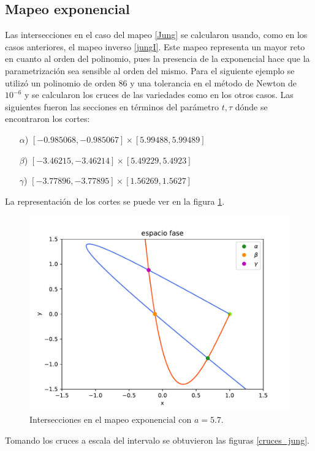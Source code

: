 \subsection{Mapeo exponencial}
Las intersecciones en el caso del mapeo \eqref{Jung} se calcularon usando, como en los casos anteriores, el mapeo inverso \eqref{jungI}. Este mapeo representa un mayor reto en cuanto al orden del polinomio, pues la presencia de la exponencial hace que la parametrización sea sensible al orden del mismo. Para el siguiente ejemplo se utilizó un polinomio de orden 86 y una tolerancia en el método de Newton de $10^{-6}$ y se calcularon los cruces de las variedades como en los otros casos. Las siguientes fueron las secciones en términos del parámetro $t,\tau$ dónde se encontraron los cortes:
\begin{itemize}
\item[$\alpha$)] $[-0.985068, -0.985067] \times [5.99488, 5.99489]$
\item[$\beta$)] $[-3.46215, -3.46214] \times [5.49229, 5.4923]$
\item[$\gamma$)] $[-3.77896, -3.77895] \times [1.56269, 1.5627]$
\end{itemize}
La representación de los cortes se puede ver en la figura \ref{jung_cortes}.
\begin{figure}[H]
\centering
\includegraphics[scale=0.7]{cruces_jung1}
\caption{Intersecciones en el mapeo exponencial con $a=5.7$.}
\label{jung_cortes}
\end{figure}

Tomando los cruces a escala del intervalo se obtuvieron las figuras \ref{cruces_jung}.

